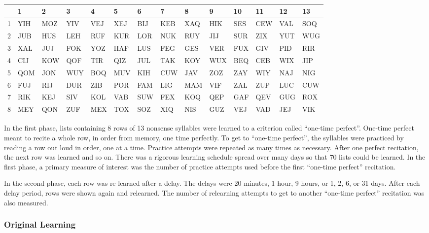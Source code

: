 \documentclass[
  oneside,
  12pt]{crumpbook}
\begin{document}
\begin{table}
\centering\begingroup\fontsize{9}{11}\selectfont

\begin{tabular}{r|l|l|l|l|l|l|l|l|l|l|l|l|l}
\hline
 & 1 & 2 & 3 & 4 & 5 & 6 & 7 & 8 & 9 & 10 & 11 & 12 & 13\\
\hline
1 & YIH & MOZ & YIV & VEJ & XEJ & BIJ & KEB & XAQ & HIK & SES & CEW & VAL & SOQ\\
\hline
2 & JUB & HUS & LEH & RUF & KUR & LOR & NUK & RUY & JIJ & SUR & ZIX & YUT & WUG\\
\hline
3 & XAL & JUJ & FOK & YOZ & HAF & LUS & FEG & GES & VER & FUX & GIV & PID & RIR\\
\hline
4 & CIJ & KOW & QOF & TIR & QIZ & JUL & TAK & KOY & WUX & BEQ & CEB & WIX & JIP\\
\hline
5 & QOM & JON & WUY & BOQ & MUV & KIH & CUW & JAV & ZOZ & ZAY & WIY & NAJ & NIG\\
\hline
6 & FUJ & RIJ & DUR & ZIB & POR & FAM & LIG & MAM & VIF & ZAL & ZUP & LUC & CUW\\
\hline
7 & RIK & KEJ & SIV & KOL & VAB & SUW & FEX & KOQ & QEP & GAF & QEV & GUG & ROX\\
\hline
8 & MEY & QON & ZUF & MEX & TOX & SOZ & XIQ & NIS & GUZ & VEJ & VAD & JEJ & VIK\\
\hline
\end{tabular}
\endgroup{}
\end{table}

In the first phase, lists containing 8 rows of 13 nonsense syllables were learned to a criterion called ``one-time perfect''. One-time perfect meant to recite a whole row, in order from memory, one time perfectly. To get to ``one-time perfect'', the syllables were practiced by reading a row out loud in order, one at a time. Practice attempts were repeated as many times as necessary. After one perfect recitation, the next row was learned and so on. There was a rigorous learning schedule spread over many days so that 70 lists could be learned. In the first phase, a primary measure of interest was the number of practice attempts used before the first ``one-time perfect'' recitation.

In the second phase, each row was re-learned after a delay. The delays were 20 minutes, 1 hour, 9 hours, or 1, 2, 6, or 31 days. After each delay period, rows were shown again and relearned. The number of relearning attempts to get to another ``one-time perfect'' recitation was also measured.

\hypertarget{original-learning}{%
\subsubsection{Original Learning}\label{original-learning}}
\end{document}
